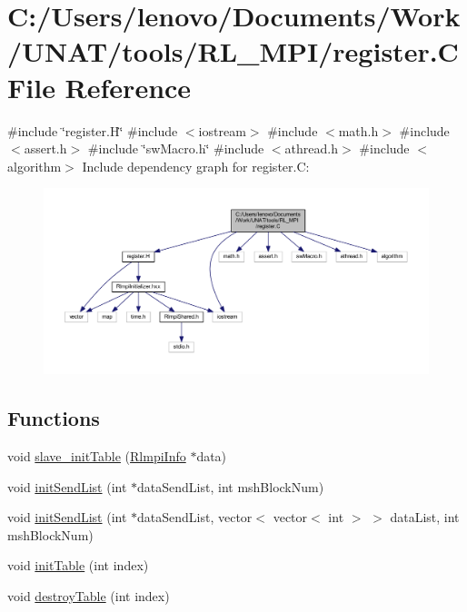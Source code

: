 \hypertarget{register_8C}{}\section{C\+:/\+Users/lenovo/\+Documents/\+Work/\+U\+N\+A\+T/tools/\+R\+L\+\_\+\+M\+P\+I/register.C File Reference}
\label{register_8C}
{\ttfamily \#include \char`\"{}register.\+H\char`\"{}}\newline
{\ttfamily \#include $<$iostream$>$}\newline
{\ttfamily \#include $<$math.\+h$>$}\newline
{\ttfamily \#include $<$assert.\+h$>$}\newline
{\ttfamily \#include \char`\"{}sw\+Macro.\+h\char`\"{}}\newline
{\ttfamily \#include $<$athread.\+h$>$}\newline
{\ttfamily \#include $<$algorithm$>$}\newline
Include dependency graph for register.\+C\+:
\nopagebreak
\begin{figure}[H]
\begin{center}
\leavevmode
\includegraphics[width=350pt]{register_8C__incl}
\end{center}
\end{figure}
\subsection*{Functions}
\begin{DoxyCompactItemize}
\item 
void \mbox{\hyperlink{register_8C_aeb710bc88af64d82c952623c9082f060}{slave\+\_\+init\+Table}} (\mbox{\hyperlink{structRlmpiInfo}{Rlmpi\+Info}} $\ast$data)
\item 
void \mbox{\hyperlink{register_8C_a4e113cf30f6198d50fb212074effcc61}{init\+Send\+List}} (int $\ast$data\+Send\+List, int msh\+Block\+Num)
\item 
void \mbox{\hyperlink{register_8C_ace23239002b4fdf135d4ad20ae2df6e7}{init\+Send\+List}} (int $\ast$data\+Send\+List, vector$<$ vector$<$ int $>$ $>$ data\+List, int msh\+Block\+Num)
\item 
void \mbox{\hyperlink{register_8C_a14fad51cfceca5a582218c98bdb3d769}{init\+Table}} (int index)
\item 
void \mbox{\hyperlink{register_8C_a099f07ebad307cc1509766f32cfcba5f}{destroy\+Table}} (int index)
\end{DoxyCompactItemize}


